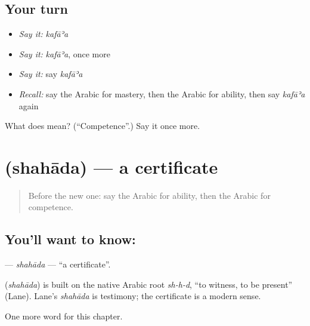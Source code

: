 \subsection*{Your turn}
\begin{itemize}
\raggedright
  \item \emph{Say it:} \emph{kafāʾa}
  \item \emph{Say it:} \emph{kafāʾa}, once more
  \item \emph{Say it:} say \emph{kafāʾa}
  \item \emph{Recall:} say the Arabic for mastery, then the Arabic for ability, then say \emph{kafāʾa} again
\end{itemize}

\begin{tcolorbox}[breakable,colback=teal!4,colframe=teal!35!black,title={Before you move on}]
What does  mean? (\textquotedblleft{}Competence\textquotedblright{}.) Say it once more.
\end{tcolorbox}
\section[\texorpdfstring{\ar{شهادة} (shahāda)}{شهادة (shahāda)}]{ (shahāda) — a certificate}

\label{lesson:AR-C107-shahada}



\begin{quote}
Before the new one: say the Arabic for ability, then the Arabic for competence.
\end{quote}

\subsection*{You'll want to know: }
\textbf{} — \emph{shahāda} — \textquotedblleft{}a certificate\textquotedblright{}.

\begin{cousinweb}
\textbf{} (\emph{shahāda}) is built on the native Arabic root \emph{sh-h-d}, \textquotedblleft{}to witness, to be present\textquotedblright{} (Lane). Lane's \emph{shahāda} is testimony; the certificate is a modern sense.
\end{cousinweb}

\begin{grammarlens}[title={What you've built}]
One more word for this chapter.
\end{grammarlens}

